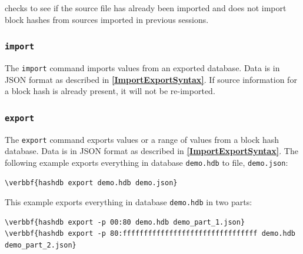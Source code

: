 \documentclass[11pt,fleqn]{article} %
\begin{document}
\hdb checks to see if the source file has already been imported and does not import block hashes from sources imported in previous sessions.\\

\subsubsection{\texttt{import}}
The \verb+import+ command imports values from an exported database. Data is in JSON format as described in \textbf{\autoref{ImportExportSyntax}}. If source information for a block hash is already present, it will not be re-imported.

\subsubsection{\texttt{export}}
The \verb+export+ command exports values or a range of values from a \hdb block hash database. Data is in JSON format as described in \textbf{\autoref{ImportExportSyntax}}. The following example exports everything in database \verb+demo.hdb+ to file, \verb+demo.json+:
\begin{Verbatim}[commandchars=\\\{\}]
\verbbf{hashdb export demo.hdb demo.json}
\end{Verbatim}

This example exports everything in database \verb+demo.hdb+ in two parts:
\begin{Verbatim}[commandchars=\\\{\}]
\verbbf{hashdb export -p 00:80 demo.hdb demo_part_1.json}
\verbbf{hashdb export -p 80:ffffffffffffffffffffffffffffffff demo.hdb demo_part_2.json}
\end{Verbatim}
\end{document}
